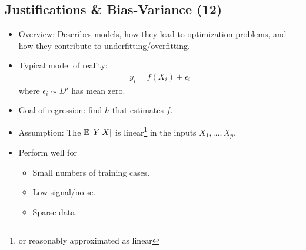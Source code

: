 \documentclass[12pt]{article}
\begin{document}
\subsection{Justifications \& Bias-Variance (12)}
\begin{itemize}
	\item Overview: Describes models, how they lead to optimization problems, and how they contribute to underfitting/overfitting.
	\item Typical model of reality:
	\begin{align}
		y_i = f(X_i) + \epsilon_i
	\end{align}
	where $\epsilon_i \sim D'$ has mean zero. 
	\item Goal of regression: find $h$ that estimates $f$. 
\end{itemize}









\newcommand\tlab[1]{\tag{#1}\label{#1}}
\label{ESL}


\begin{itemize}
	\item Assumption: The  $\mathbb{E}_{}\left[Y|X\right]$ is linear\footnote{or reasonably approximated as linear} in the inputs $X_1, \ldots, X_p$. 
	\item Perform well for\textellipsis
	\begin{itemize}
		\item Small numbers of training cases.
		\item Low signal/noise.
		\item Sparse data. 
	\end{itemize}
\end{itemize}
	
\end{document}
